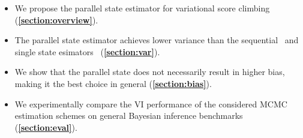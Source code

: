 \begin{itemize}[noitemsep]
\item[\ding{228}] We propose the parallel state estimator for variational score climbing (\textbf{\cref{section:overview}}).
\item[\ding{228}] The parallel state estimator achieves lower variance than the sequential~\citep{pmlr-v124-ou20a} and single state esimators~\citep{NEURIPS2020_b2070693} (\textbf{\cref{section:var}}).
\item[\ding{228}] We show that the parallel state does not necessarily result in higher bias, making it the best choice in general (\textbf{\cref{section:bias}}).
\item[\ding{228}] We experimentally compare the VI performance of the considered MCMC estimation schemes on general Bayesian inference benchmarks (\textbf{\cref{section:eval}}).
\end{itemize}
\vspace{-0.05in}


